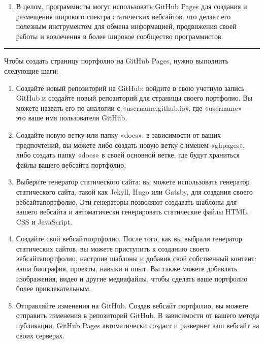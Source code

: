 \documentclass[letterpaper,10pt,russian]{sphinxmanual}
\begin{document}
\begin{enumerate}
\item {} 
\sphinxAtStartPar
В целом, программисты могут использовать GitHub Pages для создания и размещения широкого спектра статических веб\sphinxhyphen{}сайтов, что делает его полезным инструментом для обмена информацией, продвижения своей работы и вовлечения в более широкое сообщество программистов.

\end{enumerate}


\bigskip\hrule\bigskip


\sphinxAtStartPar
{}
Чтобы создать страницу портфолио на GitHub Pages, нужно выполнить следующие шаги:
\begin{enumerate}
%
\item {} 
\sphinxAtStartPar
Создайте новый репозиторий на GitHub: войдите в свою учетную запись GitHub и создайте новый репозиторий для страницы своего портфолио. Вы можете назвать его по аналогии с  «username.github.io», где «username» — это ваше имя пользователя GitHub.

\item {} 
\sphinxAtStartPar
Создайте новую ветку или папку «docs»: в зависимости от ваших предпочтений, вы можете либо создать новую ветку с именем «gh\sphinxhyphen{}pages», либо создать папку «docs» в своей основной ветке, где будут храниться файлы вашего веб\sphinxhyphen{}сайта портфолио.

\item {} 
\sphinxAtStartPar
Выберите генератор статического сайта: вы можете использовать генератор статического сайта, такой как Jekyll, Hugo или Gatsby, для создания своего веб\sphinxhyphen{}сайта\sphinxhyphen{}портфолио. Эти генераторы позволяют создавать шаблоны для вашего веб\sphinxhyphen{}сайта и автоматически генерировать статические файлы HTML, CSS и JavaScript.

\item {} 
\sphinxAtStartPar
Создайте свой веб\sphinxhyphen{}сайт\sphinxhyphen{}портфолио. После того, как вы выбрали генератор статических сайтов, вы можете приступить к созданию своего веб\sphinxhyphen{}сайта\sphinxhyphen{}портфолио, настроив шаблоны и добавив свой собственный контент: ваша биография, проекты, навыки и опыт. Вы также можете добавлять изображения, видео и другие медиафайлы, чтобы сделать ваше портфолио более привлекательным.

\item {} 
\sphinxAtStartPar
Отправляйте изменения на GitHub. Создав веб\sphinxhyphen{}сайт портфолио, вы можете отправить изменения в репозиторий GitHub. В зависимости от вашего метода публикации, GitHub Pages автоматически создаст и развернет ваш веб\sphinxhyphen{}сайт на своих серверах.


\end{enumerate}
\end{document}
